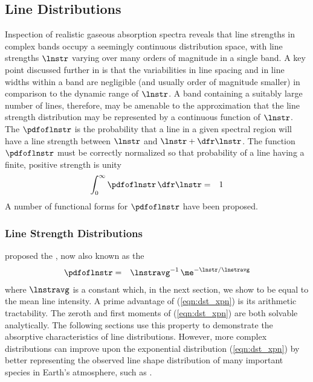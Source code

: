 \documentclass[12pt]{article}
\begin{document}
\subsection[Line Distributions]{Line Distributions}\label{sxn:ld}
Inspection of realistic gaseous absorption spectra reveals that line
strengths in complex bands occupy a seemingly continuous distribution
space, with line strengths $\lnstr$ varying over many orders of
magnitude in a single band.
A key point discussed further in \cite{GoY89} is that the variabilities
in line spacing and in line widths within a band are negligible
(and usually order of magnitude smaller) in comparison to the dynamic
range of $\lnstr$.
A band containing a suitably large number of lines, therefore, 
may be amenable to the approximation that the line strength
distribution may be represented by a continuous function of $\lnstr$. 
The  $\pdfoflnstr$ is the
probability that a line in a given spectral region will have a line
strength between $\lnstr$ and $\lnstr + \dfr\lnstr$.
The function $\pdfoflnstr$ must be correctly normalized so that
probability of a line having a finite, positive strength is unity
\begin{eqnarray}
\int_{0}^{\infty} \pdfoflnstr \,\dfr\lnstr & = & 1
\label{eqn:pdf_lnstr_nrm}
\end{eqnarray}
A number of functional forms for $\pdfoflnstr$ have been proposed.

\subsubsection[Line Strength Distributions]{Line Strength Distributions}\label{sxn:lsd}
\cite{Goo52} proposed the , now also known as the  
\begin{eqnarray}
\pdfoflnstr & = & \lnstravg^{-1} \, \me^{-\lnstr/\lnstravg}
\label{eqn:dst_xpn}
\end{eqnarray}
where $\lnstravg$ is a constant which, in the next section,
we show to be equal to the mean line intensity.
A prime advantage of (\ref{eqn:dst_xpn}) is its arithmetic
tractability. 
The zeroth and first moments of (\ref{eqn:dst_xpn}) are both
solvable analytically. 
The following sections use this property to demonstrate the
absorptive characteristics of line distributions.
However, more complex distributions can improve upon the exponential
distribution (\ref{eqn:dst_xpn}) by better representing the observed 
line shape distribution of many important species in Earth's
atmosphere, such as \HdO.
\end{document}

